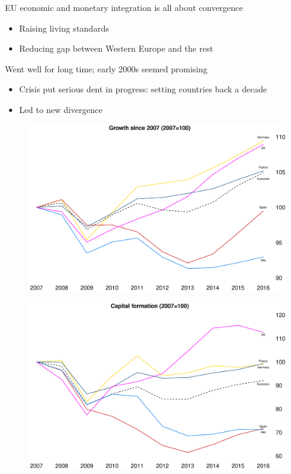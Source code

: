 \documentclass{beamer}
\begin{document}
\begin{frame} 
  EU economic and monetary integration is all about convergence
  \begin{itemize}
    \item Raising living standards
    \item Reducing gap between Western Europe and the rest
  \end{itemize}
  \medskip
  Went well for long time; early 2000s seemed promising
  \begin{itemize}
    \item Crisis put serious dent in progress: setting countries back a decade
    \item Led to new divergence
  \end{itemize}
\end{frame}

\begin{frame}
  \begin{figure}
    \includegraphics[scale=.3]{economic_growth.eps}
  \end{figure}
\end{frame}

\begin{frame}
  \begin{figure}
    \includegraphics[scale=.3]{capital_formation.eps}
  \end{figure}
\end{frame}
\end{document}
